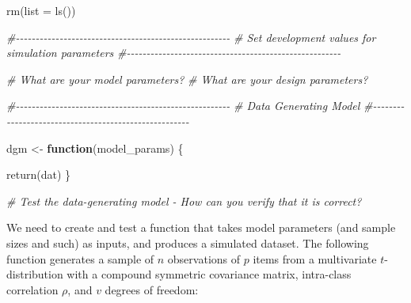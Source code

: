 \documentclass[
]{book}
\newenvironment{Shaded}{\begin{snugshade}}{\end{snugshade}}
\newcommand{\AttributeTok}[1]{\textcolor[rgb]{0.77,0.63,0.00}{#1}}
\newcommand{\CommentTok}[1]{\textcolor[rgb]{0.56,0.35,0.01}{\textit{#1}}}
\newcommand{\ControlFlowTok}[1]{\textcolor[rgb]{0.13,0.29,0.53}{\textbf{#1}}}
\newcommand{\FunctionTok}[1]{\textcolor[rgb]{0.00,0.00,0.00}{#1}}
\newcommand{\NormalTok}[1]{#1}
\newcommand{\OtherTok}[1]{\textcolor[rgb]{0.56,0.35,0.01}{#1}}
\begin{document}
\begin{Shaded}
\begin{Highlighting}[]
\FunctionTok{rm}\NormalTok{(}\AttributeTok{list =} \FunctionTok{ls}\NormalTok{())}

\CommentTok{\#{-}{-}{-}{-}{-}{-}{-}{-}{-}{-}{-}{-}{-}{-}{-}{-}{-}{-}{-}{-}{-}{-}{-}{-}{-}{-}{-}{-}{-}{-}{-}{-}{-}{-}{-}{-}{-}{-}{-}{-}{-}{-}{-}{-}{-}{-}{-}{-}{-}{-}{-}{-}{-}{-}}
\CommentTok{\# Set development values for simulation parameters}
\CommentTok{\#{-}{-}{-}{-}{-}{-}{-}{-}{-}{-}{-}{-}{-}{-}{-}{-}{-}{-}{-}{-}{-}{-}{-}{-}{-}{-}{-}{-}{-}{-}{-}{-}{-}{-}{-}{-}{-}{-}{-}{-}{-}{-}{-}{-}{-}{-}{-}{-}{-}{-}{-}{-}{-}{-}}

\CommentTok{\# What are your model parameters?}
\CommentTok{\# What are your design parameters?}

\CommentTok{\#{-}{-}{-}{-}{-}{-}{-}{-}{-}{-}{-}{-}{-}{-}{-}{-}{-}{-}{-}{-}{-}{-}{-}{-}{-}{-}{-}{-}{-}{-}{-}{-}{-}{-}{-}{-}{-}{-}{-}{-}{-}{-}{-}{-}{-}{-}{-}{-}{-}{-}{-}{-}{-}{-}}
\CommentTok{\# Data Generating Model}
\CommentTok{\#{-}{-}{-}{-}{-}{-}{-}{-}{-}{-}{-}{-}{-}{-}{-}{-}{-}{-}{-}{-}{-}{-}{-}{-}{-}{-}{-}{-}{-}{-}{-}{-}{-}{-}{-}{-}{-}{-}{-}{-}{-}{-}{-}{-}{-}{-}{-}{-}{-}{-}{-}{-}{-}{-}}

\NormalTok{dgm }\OtherTok{\textless{}{-}} \ControlFlowTok{function}\NormalTok{(model\_params) \{}

  \FunctionTok{return}\NormalTok{(dat)}
\NormalTok{\}}

\CommentTok{\# Test the data{-}generating model {-} How can you verify that it is correct?}
\end{Highlighting}
\end{Shaded}

We need to create and test a function that takes model parameters (and sample sizes and such) as inputs, and produces a simulated dataset.
The following function generates a sample of \(n\) observations of \(p\) items from a multivariate \(t\)-distribution with a compound symmetric covariance matrix, intra-class correlation \(\rho\), and \(v\) degrees of freedom:
\end{document}
